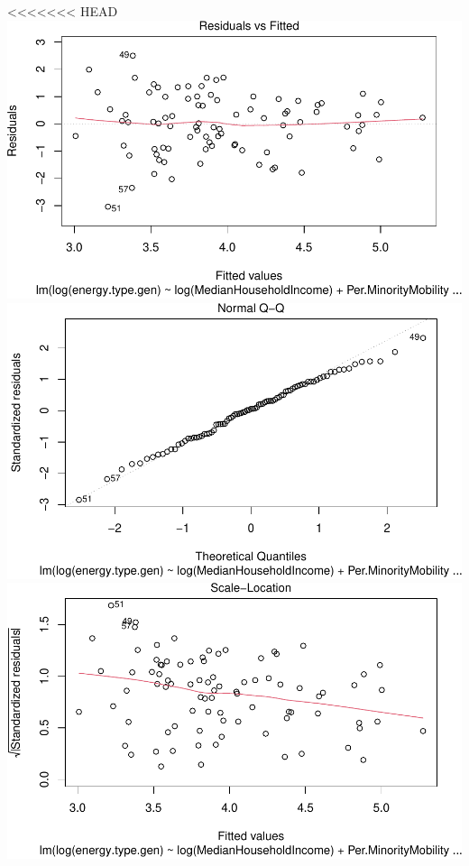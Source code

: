\documentclass[
  12pt,
]{article}
\begin{document}
<<<<<<< HEAD
\includegraphics{Project_files/figure-latex/unnamed-chunk-6-1.pdf}
\includegraphics{Project_files/figure-latex/unnamed-chunk-6-2.pdf}
\includegraphics{Project_files/figure-latex/unnamed-chunk-6-3.pdf}
\end{document}
